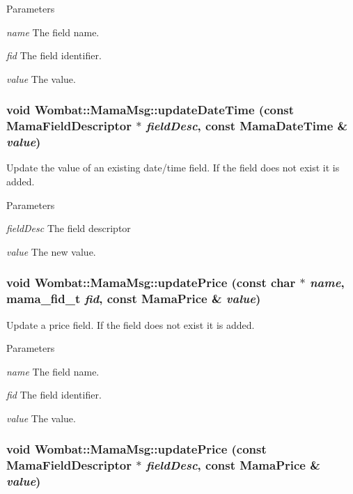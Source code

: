 \begin{DoxyParams}{Parameters}
\item[{\em name}]The field name. \item[{\em fid}]The field identifier. \item[{\em value}]The value. \end{DoxyParams}
\hypertarget{classWombat_1_1MamaMsg_a4c15e9fcf0ae8960d31c1af2b536aab2}{
\subsubsection[{updateDateTime}]{\setlength{\rightskip}{0pt plus 5cm}void Wombat::MamaMsg::updateDateTime (const {\bf MamaFieldDescriptor} $\ast$ {\em fieldDesc}, \/  const {\bf MamaDateTime} \& {\em value})}}
\label{classWombat_1_1MamaMsg_a4c15e9fcf0ae8960d31c1af2b536aab2}


Update the value of an existing date/time field. If the field does not exist it is added.


\begin{DoxyParams}{Parameters}
\item[{\em fieldDesc}]The field descriptor \item[{\em value}]The new value. \end{DoxyParams}
\hypertarget{classWombat_1_1MamaMsg_a66f6fca3309a5b534404c616eb334219}{
\subsubsection[{updatePrice}]{\setlength{\rightskip}{0pt plus 5cm}void Wombat::MamaMsg::updatePrice (const char $\ast$ {\em name}, \/  mama\_\-fid\_\-t {\em fid}, \/  const {\bf MamaPrice} \& {\em value})}}
\label{classWombat_1_1MamaMsg_a66f6fca3309a5b534404c616eb334219}


Update a price field. If the field does not exist it is added.


\begin{DoxyParams}{Parameters}
\item[{\em name}]The field name. \item[{\em fid}]The field identifier. \item[{\em value}]The value. \end{DoxyParams}
\hypertarget{classWombat_1_1MamaMsg_a58735cb8ee0a928d6196aa1806f63371}{
\subsubsection[{updatePrice}]{\setlength{\rightskip}{0pt plus 5cm}void Wombat::MamaMsg::updatePrice (const {\bf MamaFieldDescriptor} $\ast$ {\em fieldDesc}, \/  const {\bf MamaPrice} \& {\em value})}}
\label{classWombat_1_1MamaMsg_a58735cb8ee0a928d6196aa1806f63371}


